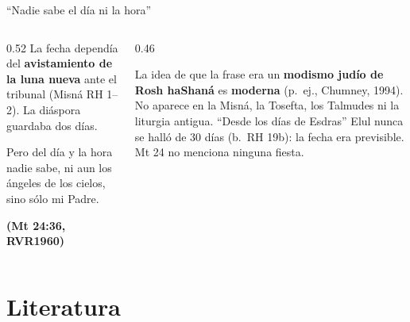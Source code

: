 \documentclass[hyperref={bookmarks=false},aspectratio=169]{beamer}
\newcommand{\fuente}[1]{\par\hfill{\upshape\bfseries\footnotesize\textcolor{tierraroja}{#1}}}
\newcommand{\destacar}[1]{\textbf{\textcolor{tierraroja}{#1}}}
\begin{document}
\begin{frame}{``Nadie sabe el día ni la hora''}
\begin{columns}[t,onlytextwidth]
\begin{column}{0.52\textwidth}\small\RaggedRight
La fecha dependía del \destacar{avistamiento de la luna nueva} ante el tribunal (Misná RH 1--2). La diáspora guardaba dos días.\par\medskip
\begin{cita}Pero del día y la hora nadie sabe, ni aun los ángeles de los cielos, sino sólo mi Padre.\fuente{(Mt 24:36, RVR1960)}\end{cita}
\end{column}
\begin{column}{0.46\textwidth}
\begin{tcolorbox}[colback=papiro,colframe=tierraroja,boxrule=1pt,arc=3pt,fontupper=\scriptsize,title={Precisión fuerte},fonttitle=\bfseries\scriptsize,colbacktitle=tierraroja,coltitle=papiro]
\RaggedRight La idea de que la frase era un \textbf{modismo judío de Rosh haShaná} es \textbf{moderna} (p.~ej., Chumney, 1994). No aparece en la Misná, la Tosefta, los Talmudes ni la liturgia antigua. ``Desde los días de Esdras'' Elul nunca se halló de 30 días (b.~RH 19b): la fecha era previsible. Mt 24 no menciona ninguna fiesta.
\end{tcolorbox}
\end{column}
\end{columns}
\end{frame}

\section{Literatura}
\end{document}
